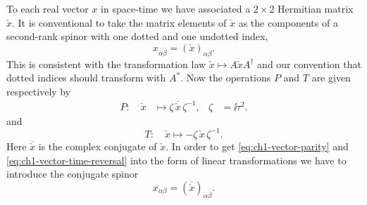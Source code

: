 To each real vector $x$ in space-time we have associated a $2\times2$ Hermitian
matrix $\check{x}$. It is conventional to take the matrix elements of
$\check{x}$ as the components of a second-rank spinor with one dotted and one
undotted index,
\begin{equation}
  x_{\alpha\dot\beta}=(\check{x})_{\alpha\dot\beta}.
  \tag{1-33}\label{eq:ch1-vector-spinor}
\end{equation}
This is consistent with the transformation law
$\check{x}\longmapsto A\check{x}A^\dagger$ and our convention that dotted
indices should transform with $A^*$. Now the operations $P$ and $T$ are given
respectively by
\begin{equation}
\begin{aligned}
  P:\quad \check{x}&\longmapsto\zeta\,\overline{\check{x}}\,\zeta^{-1}, &
  \zeta&=\ii\tau^2.
\end{aligned}
  \tag{1-34}\label{eq:ch1-vector-parity}
\end{equation}
and
\begin{equation}
  T:\quad \check{x}\longmapsto-\zeta\,\check{x}\,\zeta^{-1}.
  \tag{1-35}\label{eq:ch1-vector-time-reversal}
\end{equation}
Here $\overline{\check{x}}$ is the complex conjugate of $\check{x}$. In order
to get \eqref{eq:ch1-vector-parity} and \eqref{eq:ch1-vector-time-reversal} into the form of linear transformations we have to
introduce the conjugate spinor
\begin{equation}
  x_{\dot\alpha\beta}
  =(\overline{\check{x}})_{\dot\alpha\beta}.
  \tag{1-36}\label{eq:ch1-conjugate-vector-spinor}
\end{equation}

